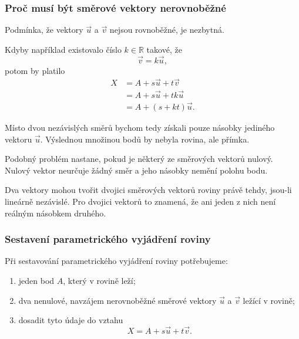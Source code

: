 \subsubsection{Proč musí být směrové vektory nerovnoběžné}
\label{subsubsec:Why_plane_vectors_nonparallel}

Podmínka, že vektory $\vec{u}$ a $\vec{v}$ nejsou rovnoběžné, je
nezbytná.

Kdyby například existovalo číslo $k\in\mathbb{R}$ takové, že
\[
    \vec{v}=k\vec{u},
\]
potom by platilo
\begin{align*}
    X
    &=A+s\vec{u}+t\vec{v}\\
    &=A+s\vec{u}+tk\vec{u}\\
    &=A+(s+kt)\vec{u}.
\end{align*}

Místo dvou nezávislých směrů bychom tedy získali pouze násobky jediného
vektoru $\vec{u}$. Výslednou množinou bodů by nebyla rovina, ale přímka.

Podobný problém nastane, pokud je některý ze směrových vektorů nulový.
Nulový vektor neurčuje žádný směr a jeho násobky nemění polohu bodu.

\begin{remark}
    Dva vektory mohou tvořit dvojici směrových vektorů roviny právě
    tehdy, jsou-li lineárně nezávislé. Pro dvojici vektorů to znamená,
    že ani jeden z nich není reálným násobkem druhého.
\end{remark}


\subsubsection{Sestavení parametrického vyjádření roviny}
\label{subsubsec:Constructing_parametric_plane}

Při sestavování parametrického vyjádření roviny potřebujeme:

\begin{enumerate}
    \item jeden bod $A$, který v rovině leží;
    \item dva nenulové, navzájem nerovnoběžné směrové vektory
    $\vec{u}$ a $\vec{v}$ ležící v rovině;
    \item dosadit tyto údaje do vztahu
    \[
        X=A+s\vec{u}+t\vec{v}.
    \]
\end{enumerate}

